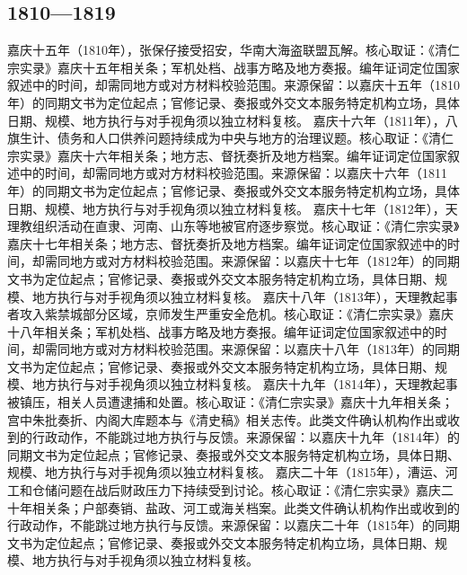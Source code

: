 \subsection{1810—1819}
嘉庆十五年（1810年），张保仔接受招安，华南大海盗联盟瓦解。核心取证：《清仁宗实录》嘉庆十五年相关条；军机处档、战事方略及地方奏报。编年证词定位国家叙述中的时间，却需同地方或对方材料校验范围。来源保留：以嘉庆十五年（1810年）的同期文书为定位起点；官修记录、奏报或外交文本服务特定机构立场，具体日期、规模、地方执行与对手视角须以独立材料复核。
嘉庆十六年（1811年），八旗生计、债务和人口供养问题持续成为中央与地方的治理议题。核心取证：《清仁宗实录》嘉庆十六年相关条；地方志、督抚奏折及地方档案。编年证词定位国家叙述中的时间，却需同地方或对方材料校验范围。来源保留：以嘉庆十六年（1811年）的同期文书为定位起点；官修记录、奏报或外交文本服务特定机构立场，具体日期、规模、地方执行与对手视角须以独立材料复核。
嘉庆十七年（1812年），天理教组织活动在直隶、河南、山东等地被官府逐步察觉。核心取证：《清仁宗实录》嘉庆十七年相关条；地方志、督抚奏折及地方档案。编年证词定位国家叙述中的时间，却需同地方或对方材料校验范围。来源保留：以嘉庆十七年（1812年）的同期文书为定位起点；官修记录、奏报或外交文本服务特定机构立场，具体日期、规模、地方执行与对手视角须以独立材料复核。
嘉庆十八年（1813年），天理教起事者攻入紫禁城部分区域，京师发生严重安全危机。核心取证：《清仁宗实录》嘉庆十八年相关条；军机处档、战事方略及地方奏报。编年证词定位国家叙述中的时间，却需同地方或对方材料校验范围。来源保留：以嘉庆十八年（1813年）的同期文书为定位起点；官修记录、奏报或外交文本服务特定机构立场，具体日期、规模、地方执行与对手视角须以独立材料复核。
嘉庆十九年（1814年），天理教起事被镇压，相关人员遭逮捕和处置。核心取证：《清仁宗实录》嘉庆十九年相关条；宫中朱批奏折、内阁大库题本与《清史稿》相关志传。此类文件确认机构作出或收到的行政动作，不能跳过地方执行与反馈。来源保留：以嘉庆十九年（1814年）的同期文书为定位起点；官修记录、奏报或外交文本服务特定机构立场，具体日期、规模、地方执行与对手视角须以独立材料复核。
嘉庆二十年（1815年），漕运、河工和仓储问题在战后财政压力下持续受到讨论。核心取证：《清仁宗实录》嘉庆二十年相关条；户部奏销、盐政、河工或海关档案。此类文件确认机构作出或收到的行政动作，不能跳过地方执行与反馈。来源保留：以嘉庆二十年（1815年）的同期文书为定位起点；官修记录、奏报或外交文本服务特定机构立场，具体日期、规模、地方执行与对手视角须以独立材料复核。
